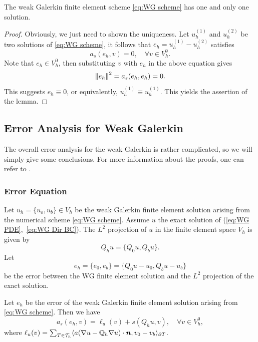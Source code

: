	\begin{lemma}
		The weak Galerkin finite element scheme \eqref{eq:WG scheme}
		has one and only one solution.
	\end{lemma}
	\begin{proof}
	Obviously, we just need to shown the uniqueness. Let $u_h^{(1)}$ and 
	$u_h^{(2)}$ be two
	solutions of \eqref{eq:WG scheme}, it follows that  
	$e_h=u_h^{(1)}-u_h^{(2)}$ satisfies
	\[a_s(e_h,v)=0, \quad \forall v\in V_h^0.\]
	Note that $e_h\in V_h^0$, then substituting $v$ with $e_h$ in the above 
	equation gives
	\[ {\left\vert\kern-0.4ex\left\vert\kern-0.4ex\left\vert e_h \right\vert\kern-0.4ex\right\vert\kern-0.4ex\right\vert}^2=a_s(e_h,e_h)=0.\]
	This suggests $e_h\equiv0$, or equivalently, $u_h^{(1)}\equiv u_h^{(1)}$. 
	This yields the assertion of the lemma.
	\end{proof}
	
	\subsection{Error Analysis for Weak Galerkin}	
	The overall error analysis for the weak Galerkin is rather complicated,
	so we will simply give some conclusions. For more information about the 
	proofs, one can refer to \cite[Section 5, 6]{WG2015}.
	
	\subsubsection*{Error Equation}
	Let $u_h=\{u_o,u_b\}\in V_h$ be the weak Galerkin finite element solution
	arising from the numerical scheme \eqref{eq:WG scheme}. Assume $u$ the exact
	solution of (\ref{eq:WG PDE},~\ref{eq:WG Dir BC}). The
	$L^2$ projection of $u$ in the finite element space $V_h$ is given by
	\[Q_h u=\{Q_0 u,Q_b u\}.\]
	Let
	\[e_h=\{e_0,e_b\}=\{Q_0 u-u_0,Q_b u-u_b\}\]
	be the error between the WG finite element solution and the $L^2$
	projection of the exact solution.
	
	\begin{lemma}
	Let $e_h$ be the error of the weak Galerkin finite element solution 
	arising from \eqref{eq:WG scheme}. Then we have
	\begin{equation}\label{eq:WG eq6.1}
		a_s(e_h,v)=\ell_u(v)+s(Q_h u,v), \quad \forall v\in V_h^0,
	\end{equation}
	where $\ell_u(v) = \sum_{T\in\mathcal{T}_h}\langle a(\nabla u-
		\mathbb{Q}_h\nabla u)\cdot\bm{n},v_0-v_b \rangle_{\partial T}$.	
	\end{lemma}	
	
